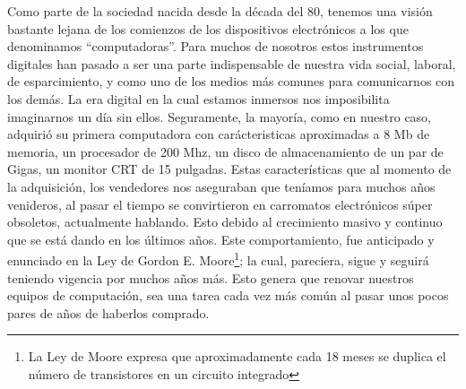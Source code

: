 \documentclass[%
 	final,
%
	notitlepage,
	narroweqnarray,
	inline,
 	twoside,
	]{ieee}
\begin{document}
Como parte de la sociedad nacida desde la d\'ecada del 80, tenemos una visi\'on bastante lejana de los comienzos de los dispositivos electr\'onicos a los que denominamos “computadoras”. Para muchos de nosotros estos instrumentos digitales han pasado a ser una parte indispensable de nuestra vida social, laboral, de esparcimiento, y como uno de los medios m\'as comunes para comunicarnos con los dem\'as. La era digital en la cual estamos inmersos nos imposibilita imaginarnos un d\'ia sin ellos. 
Seguramente, la mayor\'ia, como en nuestro caso, adquiri\'o su primera computadora con car\'acteristicas aproximadas a 8 Mb de memoria, un procesador de 200 Mhz, un disco de almacenamiento de un par de Gigas, un monitor CRT de 15 pulgadas. Estas caracter\'isticas que al momento de la adquisici\'on, los vendedores nos aseguraban que ten\'iamos para muchos a\~nos venideros, al pasar el tiempo se convirtieron en carromatos electr\'onicos s\'uper obsoletos, actualmente hablando. Esto debido al crecimiento masivo y continuo que se est\'a dando en los \'ultimos a\~nos.
Este comportamiento, fue anticipado y enunciado en la Ley de Gordon E. Moore\footnote{La Ley de Moore expresa que aproximadamente cada 18 meses se duplica el n\'umero de transistores en un circuito integrado\cite{LeyMoore}}; la cual, pareciera, sigue y seguir\'a teniendo vigencia por muchos a\~nos m\'as. Esto genera que renovar nuestros equipos de computaci\'on, sea una tarea cada vez m\'as com\'un al pasar unos pocos pares de a\~nos de haberlos comprado.
\end{document}
